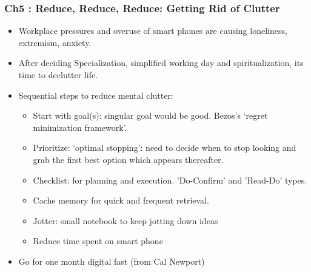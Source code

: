 \begin{frame}[fragile]\frametitle{Ch5 : Reduce, Reduce, Reduce: Getting Rid of Clutter}

\begin{itemize}
\item Workplace pressures and overuse of smart phones are causing loneliness, extremism, anxiety.
\item After deciding Specialization, simplified working day and spiritualization, its time to declutter life.
\item Sequential steps to reduce mental clutter:
	\begin{itemize}
	\item Start with goal(s): singular goal would be good. Bezos's `regret minimization framework'.
	\item Prioritize:  `optimal stopping': need to decide when to stop looking and grab the first best option which appears thereafter.
	\item Checklist: for planning and execution. 'Do-Confirm' and 'Read-Do' types.
	\item Cache memory for quick and frequent retrieval.
	\item Jotter: small notebook to keep jotting down ideas
	\item Reduce time spent on smart phone
	\end{itemize}
\item Go for one month digital fast (from Cal Newport)

\end{itemize}

\end{frame}

